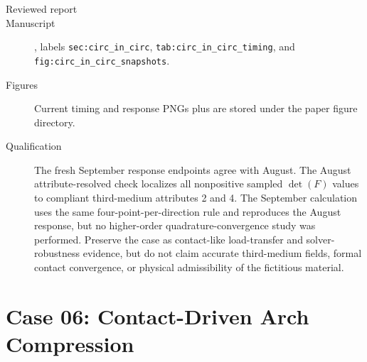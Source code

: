 \documentclass[11pt]{article}
\begin{document}
\begin{description}
  \item[Reviewed report] 
  \item[Manuscript] , labels \texttt{sec:circ\_in\_circ}, \texttt{tab:circ\_in\_circ\_timing}, and \texttt{fig:circ\_in\_circ\_snapshots}.
  \item[Figures] Current timing and response PNGs plus  are stored under the paper figure directory.
  \item[Qualification] The fresh September response endpoints agree with August.  The August attribute-resolved check localizes all nonpositive sampled $\det(F)$ values to compliant third-medium attributes 2 and 4.  The September calculation uses the same four-point-per-direction rule and reproduces the August response, but no higher-order quadrature-convergence study was performed. Preserve the case as contact-like load-transfer and solver-robustness evidence, but do not claim accurate third-medium fields, formal contact convergence, or physical admissibility of the fictitious material.
\end{description}

\section*{Case 06: Contact-Driven Arch Compression}
\end{document}
